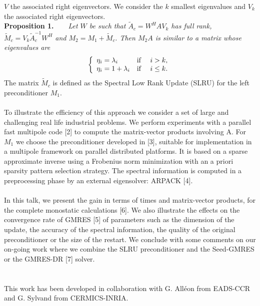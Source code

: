 \documentclass{report}
\begin{document}
$V$ the associated right eigenvectors. We consider the $k$ smallest
eigenvalues and $V_k$ the associated right eigenvectors.\\
{\bf Proposition 1.~~~}
{\it Let $W$ be such that
$\tilde{A}_c = W^H A V_k $ has full rank,
$ {\tilde{M}}_c = V_k \tilde{A}_c^{-1} W^{H} $ and
$ M_2 = M_1 + {\tilde{M}}_c.$
Then $M_{2}A$ is similar to a matrix whose eigenvalues are
$$
\left \{
\begin{array}{l l l}
\eta_i = \lambda_i & \mbox{\rm if } & i > k , \\
\eta_i = 1 + \lambda_i & \mbox{\rm if } & i \leq k . \\
\end{array}
\right .
$$
}
The matrix ${\tilde{M}}_c$ is defined as the Spectral Low Rank Update
(SLRU) for the left preconditioner $M_1$.\\
\\
To illustrate the efficiency of this approach we consider a set of large
and challenging real life industrial problems.
We perform experiments with a parallel fast multipole code [2] to compute
the matrix-vector products involving A.
For $M_1$ we choose the preconditioner developed in [3], suitable for
implementation in a multipole framework on parallel distributed
platforms.
It is based on a sparse approximate inverse using a Frobenius norm
minimization with an a priori sparsity pattern selection strategy.
The spectral information is computed in a preprocessing phase by an
external eigensolver: ARPACK [4].\\
\\
In this talk, we present the gain in terms of times and matrix-vector
products, for the complete monostatic calculations [6].
We also illustrate the effects on the convergence rate of GMRES [5] of
parameters such as the dimension of the update, the accuracy
of the spectral information, the quality of the original preconditioner
or the size of the restart.
We conclude with some comments on our on-going work where we combine the
SLRU preconditioner and the Seed-GMRES or the GMRES-DR [7] solver.\\
\\
\\
This work has been developed in collaboration with G. All{\'e}on from
EADS-CCR and G. Sylvand from CERMICS-INRIA.\\
\\
\\
\end{document}
